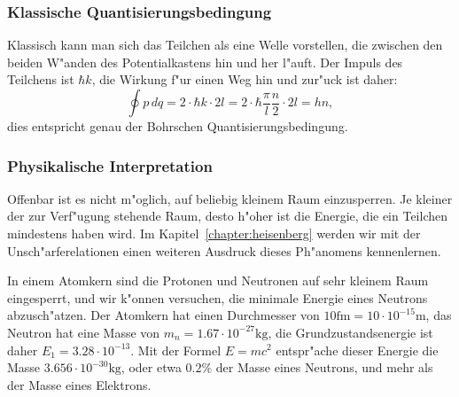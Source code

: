\subsubsection{Klassische Quantisierungsbedingung}
Klassisch kann man sich das Teilchen als eine Welle vorstellen, die
zwischen den beiden W"anden des Potentialkastens hin und her l"auft.
Der Impuls des Teilchens ist $\hbar k$, die Wirkung f"ur einen Weg
hin und zur"uck ist daher:
\[
\oint p\,dq
=
2\cdot \hbar k \cdot 2l = 2\cdot \hbar \frac{\pi}{l}\frac{n}{2}\cdot 2l=hn,
\]
dies entspricht genau der Bohrschen Quantisierungsbedingung.

\subsubsection{Physikalische Interpretation}
Offenbar ist es nicht m"oglich, auf beliebig kleinem Raum einzusperren.
Je kleiner der zur Verf"ugung stehende Raum, desto h"oher ist die
Energie, die ein Teilchen mindestens haben wird.
Im Kapitel~\ref{chapter:heisenberg} werden wir mit der Unsch"arferelationen
einen weiteren Ausdruck dieses Ph"anomens kennenlernen.

In einem Atomkern sind die Protonen und Neutronen auf sehr kleinem
Raum eingesperrt, und wir k"onnen versuchen, die minimale Energie 
eines Neutrons abzusch"atzen.
Der Atomkern hat einen Durchmesser von $10\text{fm}=10\cdot 10^{-15}\text{m}$,
das Neutron hat eine Masse von $m_n=1.67\cdot 10^{-27}\text{kg}$,
die Grundzustandsenergie ist daher $E_1=3.28\cdot10^{-13}$.
Mit der Formel $E=mc^2$ entspr"ache dieser Energie die Masse
$3.656\cdot 10^{-30}\text{kg}$, oder etwa $0.2\%$ der Masse eines
Neutrons, und mehr als der Masse eines Elektrons.

